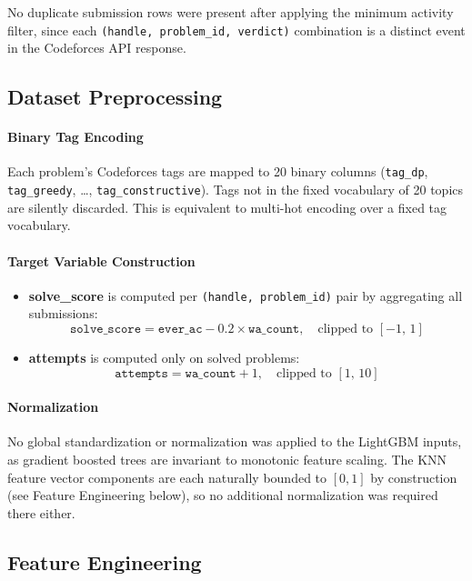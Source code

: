 \documentclass[12pt,a4paper]{article}
\begin{document}
No duplicate submission rows were present after applying the minimum activity
filter, since each \texttt{(handle, problem\_id, verdict)} combination is a
distinct event in the Codeforces API response.

\subsection*{Dataset Preprocessing}

\paragraph{Binary Tag Encoding}
Each problem's Codeforces tags are mapped to 20 binary columns
(\texttt{tag\_dp}, \texttt{tag\_greedy}, \ldots, \texttt{tag\_constructive}).
Tags not in the fixed vocabulary of 20 topics are silently discarded. This is
equivalent to multi-hot encoding over a fixed tag vocabulary.

\paragraph{Target Variable Construction}
\begin{itemize}
    \item \textbf{solve\_score} is computed per \texttt{(handle, problem\_id)} pair
          by aggregating all submissions:
          \[
              \texttt{solve\_score} = \texttt{ever\_ac} - 0.2 \times \texttt{wa\_count},
              \quad \text{clipped to } [-1,\, 1]
          \]
    \item \textbf{attempts} is computed only on solved problems:
          \[
              \texttt{attempts} = \texttt{wa\_count} + 1,
              \quad \text{clipped to } [1,\, 10]
          \]
\end{itemize}

\paragraph{Normalization}
No global standardization or normalization was applied to the LightGBM inputs,
as gradient boosted trees are invariant to monotonic feature scaling. The KNN
feature vector components are each naturally bounded to $[0,1]$ by construction
(see Feature Engineering below), so no additional normalization was required
there either.

\subsection*{Feature Engineering}
\end{document}
